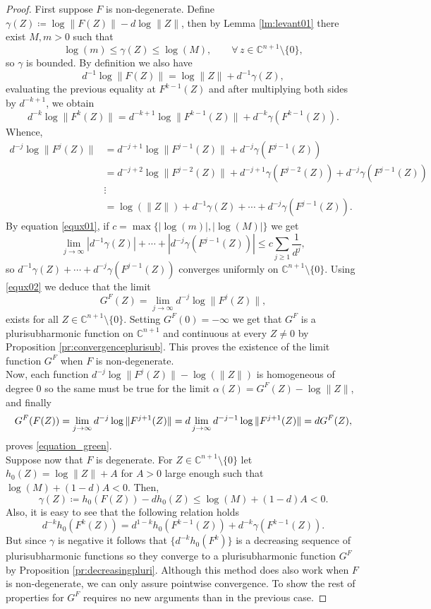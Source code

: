 \begin{proof}
First suppose $F$ is non-degenerate. Define $\gamma(Z) \coloneqq \log\|F(Z)\| - d \log\|Z\|$, then by Lemma \ref{lm:levant01} there exist $M,m>0$ such that
\begin{equation}\label{equx01}
\log(m) \leq \gamma(Z) \leq \log(M), \qquad \forall\,z\in \mathbb{C}^{n+1}\setminus\{0\},
\end{equation}
so $\gamma$ is bounded. By definition we also have
$$d^{-1}\log\|F(Z)\| = \log\|Z\| + d^{-1}\gamma(Z),$$
evaluating the previous equality at $F^{k-1}(Z)$ and after multiplying both sides by $d^{-k+1}$, we obtain
$$d^{-k}\log\|F^k(Z)\| = d^{-k+1}\log\|F^{k-1}(Z)\| + d^{-k}\gamma(F^{k-1}(Z)).$$
Whence,
\begin{align}\label{equx02}
d^{-j}\log\|F^j(Z)\| &=  d^{-j+1}\log\|F^{j-1}(Z)\| + d^{-j}\gamma(F^{j-1}(Z)) \nonumber\\
&= d^{-j+2}\log\|F^{j-2}(Z)\| + d^{-j+1}\gamma(F^{j-2}(Z)) + d^{-j}\gamma(F^{j-1}(Z)) \nonumber\\
&\vdots \nonumber\\
&= \log( \|Z\|) + d^{-1}\gamma(Z) + \cdots + d^{-j}\gamma(F^{j-1}(Z)).
\end{align}
By equation \eqref{equx01}, if $c=\max\{|\log(m)|,|\log(M)|\}$ we get
$$ \lim_{j \rightarrow \infty} |d^{-1}\gamma(Z)| + \cdots + |d^{-j}\gamma(F^{j-1}(Z))| \leq c \sum_{j\geq 1} \frac{1}{d^j},$$
so $d^{-1}\gamma(Z) + \cdots + d^{-j}\gamma(F^{j-1}(Z))$ converges uniformly on $\mathbb{C}^{n+1}\setminus \{0\}$. Using \eqref{equx02} we deduce that the limit
$$G^F(Z) = \lim_{j\rightarrow \infty}d^{-j}\log\|F^j(Z)\|,$$
exists for all $Z\in \mathbb{C}^{n+1}\setminus\{0\}$. Setting $G^F(0) = -\infty$ we get that $G^F$ is a plurisubharmonic function on $\mathbb{C}^{n+1}$ and continuous at every $Z\neq 0$ by Proposition \ref{pr:convergenceplurisub}. This proves the existence of the limit function $G^F$ when $F$ is non-degenerate.\\

Now, each function $d^{-j}\log\|F^j(Z)\|-\log(\|Z\|)$ is homogeneous of degree $0$ so the same must be true for the limit $\alpha(Z) = G^F(Z)- \log\|Z\|$, and finally
$$G^F (F(Z)) = \lim_{j\rightarrow \infty}d^{-j}\log\|F^{j+1}(Z)\| = d\lim_{j\rightarrow \infty}d^{-j-1}\log\|F^{j+1}(Z)\|=dG^F(Z),$$
proves \eqref{equation_green}.\\

Suppose now that $F$ is degenerate. For $Z\in \mathbb{C}^{n+1}\setminus\{0\}$ let $h_0(Z) = \log\|Z\| + A$ for $A>0$ large enough such that $\log(M) + (1-d)A<0$. Then,
$$\gamma(Z) \coloneqq h_0(F(Z))-dh_0(Z) \leq \log(M)+(1-d)A<0.$$
Also, it is easy to see that the following relation holds
$$d^{-k}h_0(F^k(Z)) =d^{1-k}h_0(F^{k-1}(Z))+ d^{-k}\gamma(F^{k-1}(Z)).$$
But since $\gamma$ is negative it follows that $\{d^{-k}h_0(F^k)\}$ is a decreasing sequence of plurisubharmonic functions so they converge to a plurisubharmonic function $G^F$ by Proposition \ref{pr:decreasingpluri}. Although this method does also work when $F$ is non-degenerate, we can only assure pointwise convergence. To show the rest of properties for $G^F$ requires no new arguments than in the previous case.
\end{proof}

